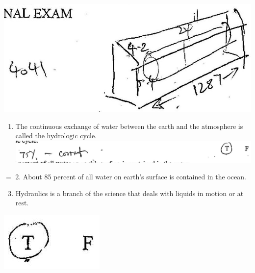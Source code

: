 \documentclass[10pt]{article}
\begin{document}
\includegraphics[max width=\textwidth]{2022_11_11_a5e8a54031fc138b833ag-1}

\begin{enumerate}
  \item The continuous exchange of water between the earth and the atmosphere is called the hydrologic cycle.\\

\includegraphics[max width=\textwidth]{2022_11_11_a5e8a54031fc138b833ag-1(1)}
\end{enumerate}

$=$ 2. About 85 percent of all water on earth's surface is contained in the ocean.

\begin{enumerate}
  \setcounter{enumi}{2}
  \item Hydraulics is a branch of the science that deals with liquids in motion or at rest.
\end{enumerate}

\includegraphics[max width=\textwidth]{2022_11_11_a5e8a54031fc138b833ag-1(2)}
\end{document}
